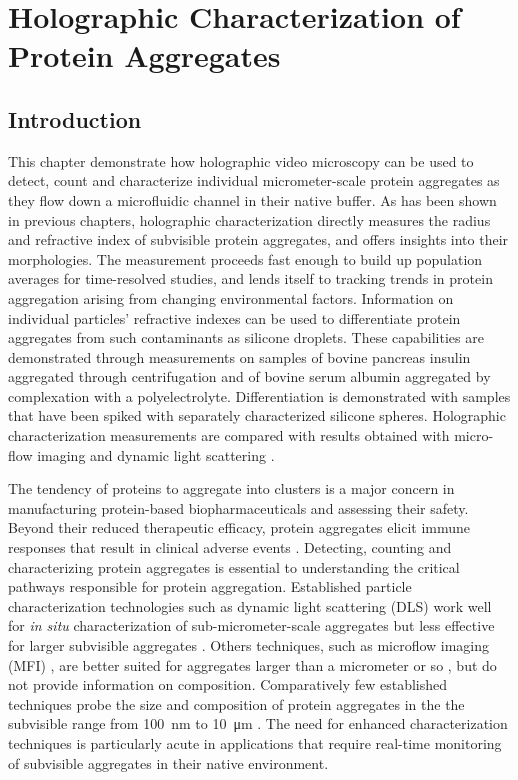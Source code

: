 \chapter{Holographic Characterization of Protein Aggregates}
\label{ch:protein}

\section{Introduction}
\label{sec:introduction}

This chapter demonstrate how holographic video microscopy can be used to detect, count and characterize individual micrometer-scale protein aggregates as they flow down a microfluidic channel in their native buffer. As has been shown in previous chapters, holographic characterization directly measures the radius and refractive index of subvisible protein aggregates, and offers insights into their morphologies. The measurement proceeds fast enough to build up population averages for time-resolved studies, and lends itself to tracking trends in protein aggregation arising from changing environmental factors. Information on individual particles’ refractive indexes can be used to differentiate protein aggregates from such contaminants as silicone droplets. These capabilities are demonstrated through measurements on samples of bovine pancreas insulin aggregated through centrifugation and of bovine serum albumin aggregated by complexation with a polyelectrolyte. Differentiation is demonstrated with samples that have been spiked with separately characterized silicone spheres. Holographic characterization measurements are compared with results obtained with micro-flow imaging and dynamic light scattering \cite{wang16}.

The tendency of proteins to aggregate into clusters
is a major concern in manufacturing protein-based
biopharmaceuticals and assessing their safety.
Beyond their reduced therapeutic efficacy, protein aggregates elicit immune responses that result in clinical adverse events \cite{FDA14, schellekens02, wang05, carpenter09, singh10, denengelsman11}.
Detecting, counting and characterizing protein aggregates
is essential to understanding the critical pathways responsible
for protein aggregation.
Established particle characterization technologies such as
dynamic light scattering (DLS) work well for \emph{in situ} characterization
of sub-micrometer-scale aggregates but less effective for larger subvisible aggregates \cite{panchal14, hamrang15}.
Others techniques, such as microflow imaging (MFI) \cite{sharma10, zolls13}, are better suited for aggregates larger than a micrometer or so \cite{hamrang15, zolls13}, but do not provide information on composition.
Comparatively few established techniques probe the size and composition of protein aggregates in the the subvisible range from 
\SI{100}{\nm} to \SI{10}{\um} \cite{hamrang15}.
The need for enhanced characterization techniques is particularly
acute in applications that require real-time monitoring of
subvisible aggregates in their native environment.

